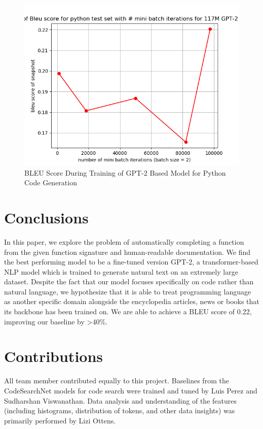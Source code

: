\documentclass[10pt,twocolumn]{article}
\begin{document}
\begin{figure}[!ht]
    \centering
    \includegraphics[scale=0.4]{figures/bleu_score.png}
    \caption{BLEU Score During Training of GPT-2 Based Model for Python Code Generation}
    \label{fig:gpt_bleu_score}
\end{figure}


\section{Conclusions}
In this paper, we explore the problem of automatically completing a function from the given function signature and human-readable documentation. We find the best performing model to be a fine-tuned version GPT-2, a transformer-based NLP model which is trained to generate natural text on an extremely large dataset. Despite the fact that our model focuses specifically on code rather than natural language, we hypothesize that it is able to treat programming language as another specific domain alongside the encyclopedia articles, news or books that its backbone has been trained on. We are able to achieve a BLEU score of 0.22, improving our baseline by >40\%.

\section{Contributions}
All team member contributed equally to this project. Baselines from the CodeSearchNet models for code search were trained and tuned by Luis Perez and Sudharshan Viswanathan. Data analysis and understanding of the features (including histograms, distribution of tokens, and other data insights) was primarily performed by Lizi Ottens.
\end{document}
